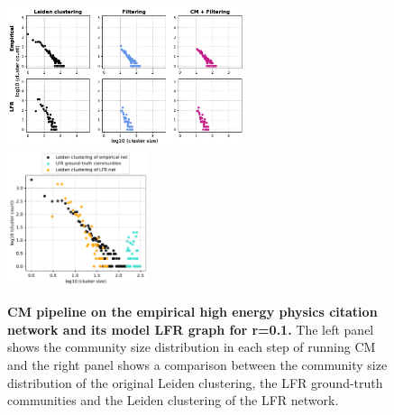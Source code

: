\documentclass[a4paper]{article}   	%
\begin{document}
\begin{figure}[h!]
\centering
\includegraphics[width=0.62\textwidth]{figs/cit_hepph_cm_steps_lfr1.pdf}
\includegraphics[width=0.37\textwidth]{figs/cit_hepph_1_cm_size.pdf}
\caption[CM pipeline on the empirical high energy  physics citation network and its model LFR graph for r=0.1]{\textbf{CM pipeline on the empirical high energy physics citation network and its model LFR graph for r=0.1.} The left panel shows the community size distribution in each step of running CM and the right panel shows a comparison between the community size distribution of the original Leiden clustering, the LFR ground-truth communities and the Leiden clustering of the LFR network.}
\label{fig:hepph-cm-lfr-1}
\end{figure}
\end{document}
